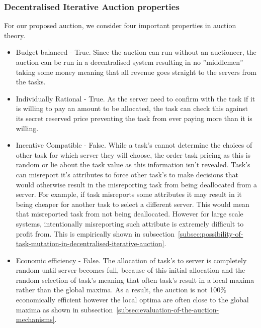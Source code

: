 \subsubsection{Decentralised Iterative Auction properties}
\label{subsubsec:decentralised-iterative-auction-properties}
For our proposed auction, we consider four important properties in auction theory.
\begin{itemize}
    \item Budget balanced - True. Since the auction can run without an auctioneer, the auction can be run in a
        decentralised system resulting in no ''middlemen'' taking some money meaning that all revenue goes straight to
        the servers from the tasks.
    \item Individually Rational - True. As the server need to confirm with the task if it is willing to pay an amount
        to be allocated, the task can check this against its secret reserved price preventing the task from ever paying
        more than it is willing.
    \item Incentive Compatible - False. While a task's cannot determine the choices of other task for which server they
        will choose, the order task pricing as this is random or lie about the task value as this information isn't
        revealed. Task's can misreport it's attributes to force other task's to make decisions that would otherwise
        result in the misreporting task from being deallocated from a server. For example, if task misreports some
        attributes it may result in it being cheaper for another task to select a different server. This would mean
        that misreported task from not being deallocated. However for large scale systems, intentionally misreporting
        such attribute is extremely difficult to profit from. This is empirically shown in
        subsection~\ref{subsec:possibility-of-task-mutation-in-decentralised-iterative-auction}.
    \item Economic efficiency - False. The allocation of task's to server is completely random until server becomes full,
        because of this initial allocation and the random selection of task's meaning that often task's result in a
        local maxima rather than the global maxima. As a result, the auction is not 100\% economically efficient
        however the local optima are often close to the global maxima as shown in
        subsection~\ref{subsec:evaluation-of-the-auction-mechanisms}.
\end{itemize}

